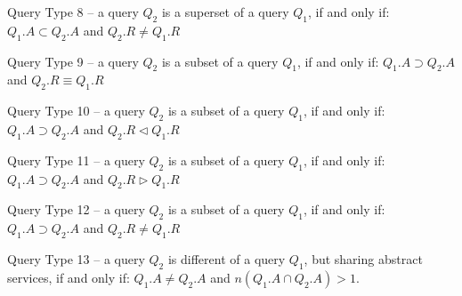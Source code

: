 \begin{definition}\label{def:qt2}
Query Type 8 -- a query $Q_{2}$ is a superset of a query $Q_{1}$, if and only if: $Q_{1}.A \subset Q_{2}.A$ and $Q_{2}.R \neq Q_{1}.R$
\end{definition}

\begin{definition}\label{def:qt2}
Query Type 9 -- a query $Q_{2}$ is a subset of a query $Q_{1}$, if and only if: $Q_{1}.A \supset Q_{2}.A$ and $Q_{2}.R \equiv Q_{1}.R$
\end{definition}

\begin{definition}\label{def:qt2}
Query Type 10 -- a query $Q_{2}$ is a subset of a query $Q_{1}$, if and only if: $Q_{1}.A \supset Q_{2}.A$ and $Q_{2}.R \triangleleft Q_{1}.R$
\end{definition}

\begin{definition}\label{def:qt2}
Query Type 11 -- a query $Q_{2}$ is a subset of a query $Q_{1}$, if and only if: $Q_{1}.A \supset Q_{2}.A$ and $Q_{2}.R \triangleright Q_{1}.R$
\end{definition}

\begin{definition}\label{def:qt2}
Query Type 12 -- a query $Q_{2}$ is a subset of a query $Q_{1}$, if and only if: $Q_{1}.A \supset Q_{2}.A$ and $Q_{2}.R \neq Q_{1}.R$
\end{definition}

\begin{definition}\label{def:qt2}
Query Type 13 -- a query $Q_{2}$ is different of a query $Q_{1}$, but sharing abstract services, if and only if: $Q_{1}.A \neq Q_{2}.A$ and $n(Q_{1}.A \cap Q_{2}.A) > 1$.
\end{definition}